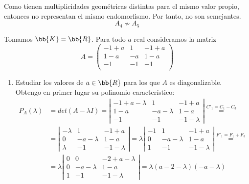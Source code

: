 \begin{ejercicio}
\begin{enumerate}
        Como tienen multiplicidades geométricas distintas para el mismo valor propio, entonces no representan el mismo endomorfismo. Por tanto, no son semejantes.
        $$A_4 \nsim A_5$$
        
    \end{enumerate}

\end{ejercicio}

\begin{ejercicio}
    Tomamos $\bb{K}=\bb{R}$. Para todo $a$ real consideramos la matriz
    \begin{equation*}
        A = \left( \begin{array}{ccc}
            -1+a & 1 & -1+a \\
            1-a & -a & 1-a \\
            -1 & -1 & -1 \\
        \end{array}\right)
    \end{equation*}
    \begin{enumerate}
        \item Estudiar los valores de $a\in \bb{R}$ para los que $A$ es diagonalizable. \\

        Obtengo en primer lugar su polinomio característico:
        \begin{equation*}
        \begin{split}
        P_A(\lambda) & = det(A-\lambda I) = \left| \begin{array}{ccc}
                -1+a-\lambda & 1 & -1+a \\
                1-a & -a-\lambda & 1-a \\
                -1 & -1 & -1-\lambda
            \end{array}\right| \stackrel{C'_1=C_1-C_3}{=} \\  
            & = \left| \begin{array}{ccc}
                -\lambda & 1 & -1+a \\
                0 & -a-\lambda & 1-a \\
                \lambda & -1 & -1-\lambda
            \end{array}\right| = \lambda
            \left| \begin{array}{ccc}
                -1 & 1 & -1+a \\
                0 & -a-\lambda & 1-a \\
                1 & -1 & -1-\lambda
            \end{array}\right| \stackrel{F'_1=F_1+F_3}{=} \\
            & =
            \lambda
            \left| \begin{array}{ccc}
                0 & 0 & -2+a-\lambda \\
                0 & -a-\lambda & 1-a \\
                1 & -1 & -1-\lambda
            \end{array}\right| = \lambda(a-2-\lambda)(-a-\lambda)
        \end{split}
        \end{equation*}
    

\end{enumerate}
\end{ejercicio}
